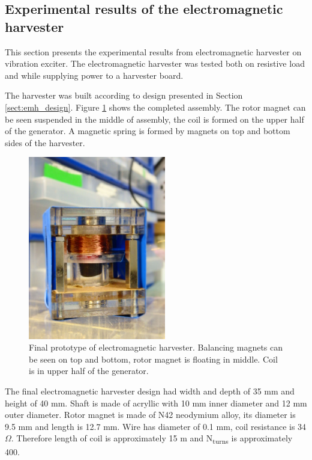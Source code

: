 \subsection{Experimental results of the electromagnetic harvester}
This section presents the experimental results from electromagnetic harvester on vibration exciter. The electromagnetic harvester was tested both on resistive load and while supplying power to a harvester board. 

The harvester was built according to design presented in Section \ref{sect:emh_design}. Figure \ref{fig:emh_final} shows the completed assembly. The rotor magnet can be seen suspended in the middle of assembly, the coil is formed on the upper half of the generator. A magnetic spring is formed by magnets on top and bottom sides of the harvester. 

\begin{figure}[htb]
\begin{center}
\includegraphics[height=8cm]{images/own_pic/inductive_harvester.jpg}
\end{center}
\caption{\label{fig:emh_final} Final prototype of electromagnetic harvester. Balancing magnets can be seen on top and bottom, rotor magnet is floating in middle. Coil is in upper half of the generator.}
\end{figure}

The final electromagnetic harvester design had width and depth of 35 mm and height of 40 mm. Shaft is made of acryllic with 10 mm inner diameter and 12 mm outer diameter. Rotor magnet is made of N42 neodymium alloy, its diameter is 9.5 mm and length is 12.7 mm. Wire has diameter of 0.1 mm, coil resistance is 34 $\Omega$. Therefore length of coil is approximately 15 m and N\textsubscript{turns} is approximately 400. 

